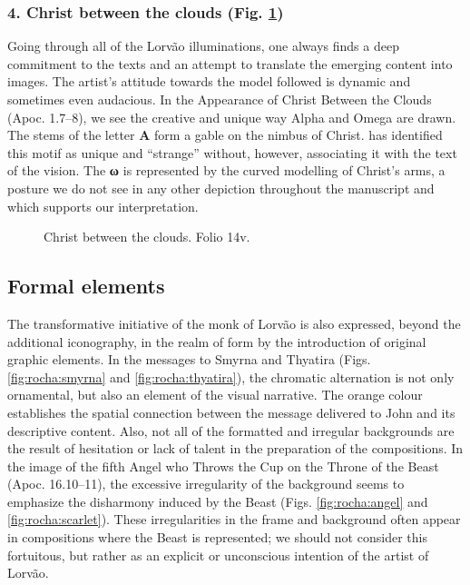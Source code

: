 \begin{paper}
\subsubsection{4. Christ between the clouds (Fig. \ref{fig:rocha:christ})} Going through all of
the Lorvão illuminations, one always finds a deep commitment to the
texts and an attempt to translate the emerging content into images. The
artist's attitude towards the model followed is dynamic and sometimes
even audacious. In the Appearance of Christ Between the Clouds (Apoc.
1.7--8), we see the creative and unique way Alpha and Omega are drawn.
The stems of the letter \textbf{Α} form a gable on the nimbus of Christ. \citet[56]{klein_beato_2004} has identified this motif as unique and ``strange''
without, however, associating it with the text of the vision. The
\textbf{ω} is represented by the curved modelling of Christ's arms, a
posture we do not see in any other depiction throughout the manuscript
and which supports our interpretation.

\begin{figure}[H]
    \centering
    \caption{Christ between the clouds. Folio 14v.}
    \label{fig:rocha:christ}
\end{figure}

\subsection*{Formal elements}

The transformative initiative of the monk of Lorvão is also expressed,
beyond the additional iconography, in the realm of form by the
introduction of original graphic elements. In the messages to Smyrna and
Thyatira (Figs. \ref{fig:rocha:smyrna} and \ref{fig:rocha:thyatira}), the chromatic alternation is not only
ornamental, but also an element of the visual narrative. The orange
colour establishes the spatial connection between the message delivered
to John and its descriptive content. Also, not all of the formatted and
irregular backgrounds are the result of hesitation or lack of talent in
the preparation of the compositions. In the image of the fifth Angel who
Throws the Cup on the Throne of the Beast (Apoc. 16.10--11), the
excessive irregularity of the background seems to emphasize the
disharmony induced by the Beast (Figs. \ref{fig:rocha:angel} and \ref{fig:rocha:scarlet}). These irregularities
in the frame and background often appear in compositions where the Beast
is represented; we should not consider this fortuitous, but rather as an
explicit or unconscious intention of the artist of Lorvão.
\vfill
\begin{figure}[H]
  \begin{minipage}[b]{0.45\textwidth}


\end{minipage}
\end{figure}
\end{paper}
